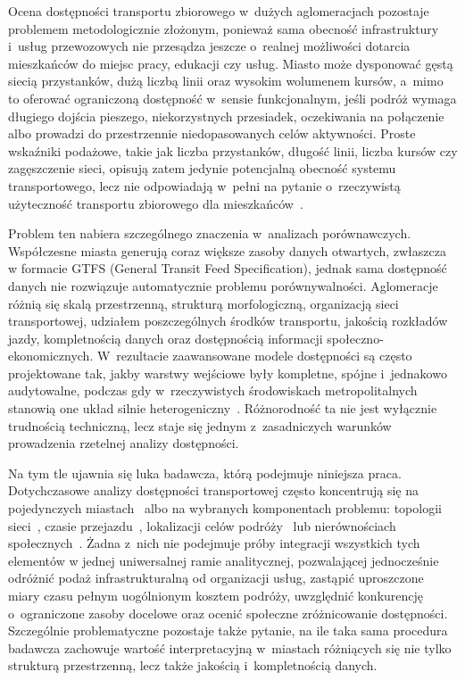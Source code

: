 \documentclass{pracamgr}
\begin{document}
Ocena dostępności transportu zbiorowego w~dużych aglomeracjach pozostaje problemem metodologicznie złożonym, ponieważ sama obecność infrastruktury i~usług przewozowych nie przesądza jeszcze o~realnej możliwości dotarcia mieszkańców do miejsc pracy, edukacji czy usług. Miasto może dysponować gęstą siecią przystanków, dużą liczbą linii oraz wysokim wolumenem kursów, a~mimo to oferować ograniczoną dostępność w~sensie funkcjonalnym, jeśli podróż wymaga długiego dojścia pieszego, niekorzystnych przesiadek, oczekiwania na połączenie albo prowadzi do przestrzennie niedopasowanych celów aktywności. Proste wskaźniki podażowe, takie jak liczba przystanków, długość linii, liczba kursów czy zagęszczenie sieci, opisują zatem jedynie potencjalną obecność systemu transportowego, lecz nie odpowiadają w~pełni na pytanie o~rzeczywistą użyteczność transportu zbiorowego dla mieszkańców~\cite{Kozlak_Aleksandra_Znaczenie_2010, LUO2019102505}.

Problem ten nabiera szczególnego znaczenia w~analizach porównawczych. Współczesne miasta generują coraz większe zasoby danych otwartych, zwłaszcza w formacie GTFS (General Transit Feed Specification), jednak sama dostępność danych nie rozwiązuje automatycznie problemu porównywalności. Aglomeracje różnią się skalą przestrzenną, strukturą morfologiczną, organizacją sieci transportowej, udziałem poszczególnych środków transportu, jakością rozkładów jazdy, kompletnością danych oraz dostępnością informacji społeczno-ekonomicznych. W~rezultacie zaawansowane modele dostępności są często projektowane tak, jakby warstwy wejściowe były kompletne, spójne i~jednakowo audytowalne, podczas gdy w~rzeczywistych środowiskach metropolitalnych stanowią one układ silnie heterogeniczny~\cite{robustness, LUO2019102505}. Różnorodność ta nie jest wyłącznie trudnością techniczną, lecz staje się jednym z~zasadniczych warunków prowadzenia rzetelnej analizy dostępności.

Na tym tle ujawnia się luka badawcza, którą podejmuje niniejsza praca. Dotychczasowe analizy dostępności transportowej często koncentrują się na pojedynczych miastach~\cite{gravity2} albo na wybranych komponentach problemu: topologii sieci~\cite{robustness}, czasie przejazdu~\cite{LUO2019102505}, lokalizacji celów podróży~\cite{gravity2} lub nierównościach społecznych~\cite{capetown, tesi}. Żadna z~nich nie podejmuje próby integracji wszystkich tych elementów w jednej uniwersalnej ramie analitycznej, pozwalającej jednocześnie odróżnić podaż infrastrukturalną od organizacji usług, zastąpić uproszczone miary czasu pełnym uogólnionym kosztem podróży, uwzględnić konkurencję o~ograniczone zasoby docelowe oraz ocenić społeczne zróżnicowanie dostępności. Szczególnie problematyczne pozostaje także pytanie, na ile taka sama procedura badawcza zachowuje wartość interpretacyjną w~miastach różniących się nie tylko strukturą przestrzenną, lecz także jakością i~kompletnością danych.
\end{document}
